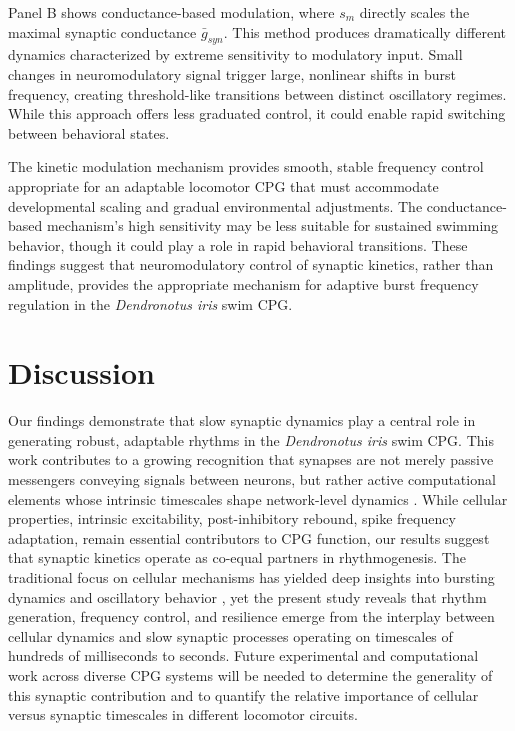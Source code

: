\documentclass[nofootinbib,aip,amsmath,amssymb,preprint,twocolumn,floatfix,10pt]{revtex4-2}
\begin{document}
Panel B shows conductance-based modulation, where $s_m$ directly scales the maximal synaptic conductance $\bar{g}_{syn}$. This method produces dramatically different dynamics characterized by extreme sensitivity to modulatory input. Small changes in neuromodulatory signal trigger large, nonlinear shifts in burst frequency, creating threshold-like transitions between distinct oscillatory regimes. While this approach offers less graduated control, it could enable rapid switching between behavioral states.

The kinetic modulation mechanism provides smooth, stable frequency control appropriate for an adaptable locomotor CPG that must accommodate developmental scaling and gradual environmental adjustments. The conductance-based mechanism's high sensitivity may be less suitable for sustained swimming behavior, though it could play a role in rapid behavioral transitions. These findings suggest that neuromodulatory control of synaptic kinetics, rather than amplitude, provides the appropriate mechanism for adaptive burst frequency regulation in the \textit{Dendronotus iris} swim CPG.

\section{Discussion}

Our findings demonstrate that slow synaptic dynamics play a central role in generating robust, adaptable rhythms in the \textit{Dendronotus iris} swim CPG. This work contributes to a growing recognition that synapses are not merely passive messengers conveying signals between neurons, but rather active computational elements whose intrinsic timescales shape network-level dynamics \cite{zucker2002short, Manor1997, NadimBucher2014}. While cellular properties, intrinsic excitability, post-inhibitory rebound, spike frequency adaptation, remain essential contributors to CPG function, our results suggest that synaptic kinetics operate as co-equal partners in rhythmogenesis. The traditional focus on cellular mechanisms has yielded deep insights into bursting dynamics and oscillatory behavior \cite{Rinzel87b, plant81}, yet the present study reveals that rhythm generation, frequency control, and resilience emerge from the interplay between cellular dynamics and slow synaptic processes operating on timescales of hundreds of milliseconds to seconds. Future experimental and computational work across diverse CPG systems will be needed to determine the generality of this synaptic contribution and to quantify the relative importance of cellular versus synaptic timescales in different locomotor circuits.
\end{document}
